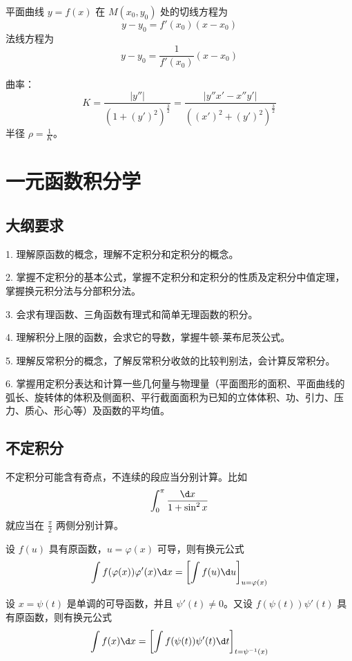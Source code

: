 平面曲线 $y = f(x)$ 在 $M(x_0, y_0)$ 处的切线方程为
\[ y - y_0 = f'(x_0)(x - x_0) \]
法线方程为
\[ y - y_0 = \frac{1}{f'(x_0)}(x - x_0) \]

曲率：
\[ K = \frac{|y''|}{\left(1 + (y')^2\right)^{\frac{3}{2}}} = \frac{|y''x' - x''y'|}{((x')^2 + (y')^2)^{\frac{3}{2}}} \]
半径 $\rho = \frac{1}{K}$。

\section{一元函数积分学}

\subsection{大纲要求}

1. 理解原函数的概念，理解不定积分和定积分的概念。

2. 掌握不定积分的基本公式，掌握不定积分和定积分的性质及定积分中值定理，掌握换元积分法与分部积分法。

3. 会求有理函数、三角函数有理式和简单无理函数的积分。

4. 理解积分上限的函数，会求它的导数，掌握牛顿-莱布尼茨公式。

5. 理解反常积分的概念，了解反常积分收敛的比较判别法，会计算反常积分。

6. 掌握用定积分表达和计算一些几何量与物理量（平面图形的面积、平面曲线的弧长、旋转体的体积及侧面积、平行截面面积为已知的立体体积、功、引力、压力、质心、形心等）及函数的平均值。

\subsection{不定积分}

\begin{note}
	不定积分可能含有奇点，不连续的段应当分别计算。比如
	\[ \int_{0}^{\pi} \frac{\d x}{1 + \sin^2 x} \]
	就应当在 $\frac{\pi}{2}$ 两侧分别计算。
\end{note}

\begin{theorem}[第一类换元积分法]
	设 $f(u)$ 具有原函数，$u = \varphi(x)$ 可导，则有换元公式
	\[ \int f(\varphi(x)) \varphi'(x) \d x = \left[\int f(u) \d u \right]_{u = \varphi(x)} \]
\end{theorem}

\begin{theorem}[第二类换元积分法]
	设 $x = \psi(t)$ 是单调的可导函数，并且 $\psi'(t) \neq 0$。又设 $f(\psi(t)) \psi'(t)$ 具有原函数，则有换元公式
	\[ \int f(x) \d x = \left[ \int f(\psi(t))\psi'(t) \d t \right]_{t = \psi^{-1}(x)} \]
\end{theorem}

